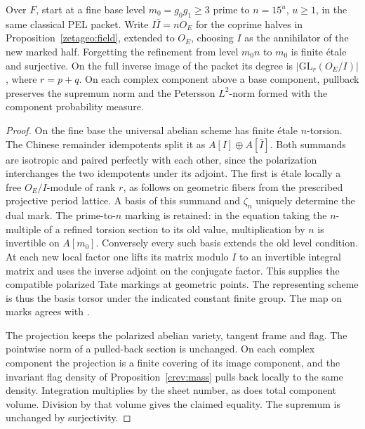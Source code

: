 \begin{proposition}
\label{addh:level}
Over \(F\), start at a fine base level \(m_0=g_0g_1\ge3\) prime to
\(n=15^u\), \(u\ge1\), in the same classical PEL packet.
Write \(I\bar I=nO_E\) for the coprime halves in
Proposition~\ref{zetageo:field}, extended to \(O_E\), choosing \(I\)
as the annihilator of the new marked half. Forgetting the refinement
from level \(m_0n\) to \(m_0\) is finite \'etale and surjective.
On the full inverse image of the packet its degree is
\(\lvert\mathrm{GL}_r(O_E/I)\rvert\), where \(r=p+q\).
On each complex component above a base component, pullback preserves
the supremum norm and the Petersson \(L^2\)-norm formed with the
component probability measure.
\end{proposition}
\begin{proof}
On the fine base the universal abelian scheme has finite \'etale
\(n\)-torsion. The Chinese remainder idempotents split it as
\(A[I]\oplus A[\bar I]\). Both summands are isotropic and paired
perfectly with each other, since the polarization interchanges the
two idempotents under its adjoint. The first is \'etale locally a
free \(O_E/I\)-module of rank \(r\), as follows on geometric fibers
from the prescribed projective period lattice. A basis of this
summand and \(\zeta_n\) uniquely determine the dual mark. The
prime-to-\(n\) marking is retained: in the equation taking the
\(n\)-multiple of a refined torsion section to its old value,
multiplication by \(n\) is invertible on \(A[m_0]\).
Conversely every such basis extends the old level condition. At
each new local factor one lifts its matrix modulo \(I\) to an
invertible integral matrix and uses the inverse adjoint on the
conjugate factor. This supplies the compatible polarized Tate
markings at geometric points. The representing scheme is thus
the basis torsor under the indicated constant finite group.
The map on marks agrees with
.

The projection keeps the polarized abelian variety, tangent frame
and flag. The pointwise norm of a pulled-back section is unchanged.
On each complex component the projection is a finite covering
of its image component, and the invariant flag density of
Proposition~\ref{crev:mass} pulls back locally to the same density.
Integration multiplies by the sheet number, as does total component
volume. Division by that volume gives the claimed equality. The
supremum is unchanged by surjectivity.
\end{proof}

